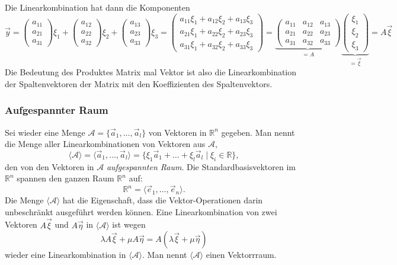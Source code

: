 Die Linearkombination hat dann die Komponenten
\[
\vec{y}
=
\begin{pmatrix}a_{11}\\a_{21}\\a_{31}\end{pmatrix}
\xi_1
+
\begin{pmatrix}a_{12}\\a_{22}\\a_{32}\end{pmatrix}
\xi_2
+
\begin{pmatrix}a_{13}\\a_{23}\\a_{33}\end{pmatrix}
\xi_3
=
\begin{pmatrix}
a_{11}\xi_1+a_{12}\xi_2+a_{13}\xi_3\\
a_{21}\xi_1+a_{22}\xi_2+a_{23}\xi_3\\
a_{31}\xi_1+a_{32}\xi_2+a_{33}\xi_3
\end{pmatrix}
=
\underbrace{
\begin{pmatrix}
a_{11}&a_{12}&a_{13}\\
a_{21}&a_{22}&a_{23}\\
a_{31}&a_{32}&a_{33}
\end{pmatrix}}_{\displaystyle=A}
\underbrace{
\begin{pmatrix}
\xi_1\\\xi_2\\\xi_3
\end{pmatrix}}_{\displaystyle=\vec{\xi}}
=
A\vec{\xi}
\]
Die Bedeutung des Produktes Matrix mal Vektor ist also die Linearkombination
der Spaltenvektoren der Matrix mit den Koeffizienten des Spaltenvektors.

\subsubsection{Aufgespannter Raum}
Sei wieder eine Menge $\mathcal{A}=\{\vec{a}_1,\dots,\vec{a}_l\}$
von Vektoren in $\mathbb R^n$ gegeben.
Man nennt die Menge aller Linearkombinationen von Vektoren aus
$\mathcal{A}$,
\[
\langle
\mathcal{A}
\rangle
=
\langle
\vec{a}_1,\dots,\vec{a}_l
\rangle
=
\{
\xi_1\vec{a}_1+\dots+\xi_l\vec{a}_l\;|\; \xi_i\in\mathbb R
\},
\]
den von den Vektoren in $\mathcal{A}$ {\em aufgespannten Raum}.
\label{skript:affin:koordinaten:aufgespannt}
Die Standardbasisvektoren im $\mathbb R^n$ spannen den ganzen Raum
$\mathbb R^n$ auf:
\[
\mathbb R^n = \langle \vec{e}_1,\dots,\vec{e}_n\rangle.
\]
Die Menge $\langle\mathcal{A}\rangle$ hat die Eigenschaft, dass die
Vektor-Operationen darin unbeschränkt ausgeführt werden können.
Eine Linearkombination von zwei 
Vektoren $A\vec{\xi}$ und $A\vec{\eta}$ in $\langle\mathcal{A}\rangle$
ist wegen
\[
\lambda A\vec{\xi} + \mu A\vec{\eta}
=
A(\lambda\vec{\xi} + \mu\vec{\eta})
\]
wieder eine Linearkombination in $\langle\mathcal{A}\rangle$.
Man nennt $\langle\mathcal{A}\rangle$ einen Vektorrraum.

